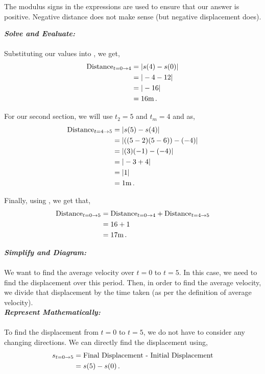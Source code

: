 \begin{subquestions}
\begin{subsubquestions}
\begin{subsubsubquestions}
The modulus signs in the expressions are used to ensure that our answer is positive. Negative distance does not make sense (but negative displacement does).


\textbf{\textit{Solve and Evaluate:}} \\ \\
Substituting our values into , we get,
\begin{align}
	\text{Distance}_{t=0 \rightarrow 4} & = |s(4)-s(0)| \nonumber \\
							& = |-4-12| \nonumber \\
	                        & = |-16| \nonumber \\
	                        & = 16 \text{m} \,.
\end{align}

For our second section, we will use $t_2=5$ and $t_m=4$ and  as,
\begin{align}
	\text{Distance}_{t=4 \rightarrow 5} & = |s(5)-s(4)| \nonumber \\
	& = |((5-2)(5-6)) -(-4)| \nonumber \\
	& = |(3)(-1)-(-4)| \nonumber \\
	& = |-3+4| \nonumber \\
	& = |1| \nonumber \\
	& = 1 \text{m} \,.
\end{align}

Finally, using , we get that,
\begin{align}
	\text{Distance}_{t=0 \rightarrow 5} & = \text{Distance}_{t=0 \rightarrow 4} + \text{Distance}_{t=4 \rightarrow 5} \nonumber \\
	                        & = 16 + 1 \nonumber \\
	                        & = 17 \text{m} \,.
\end{align}


\subsubsubquestion

\textbf{\textit{Simplify and Diagram:}} \\ \\
We want to find the average velocity over $t=0$ to $t=5$. In this case, we need to find the displacement over this period. Then, in order to find the average velocity, we divide that displacement by the time taken (as per the definition of average velocity). \\

\textbf{\textit{Represent Mathematically:}} \\ \\
To find the displacement from $t=0$ to $t=5$, we do not have to consider any changing directions. We can directly find the displacement using,
\begin{align}
	s_{t=0 \rightarrow 5} & = \text{Final Displacement - Initial Displacement} \nonumber \\
	                      & =  s(5)-s(0) \,. \label{2014:q5:Seqn4} 
\end{align}


\end{subsubsubquestions}
\end{subsubquestions}
\end{subquestions}

